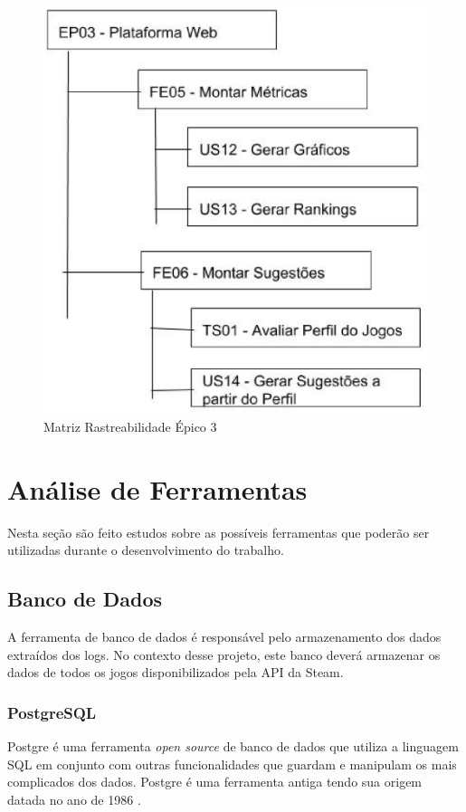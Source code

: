 \begin{figure}
\centering
\includegraphics[scale=0.35]{figuras/EP03.eps}
\caption{Matriz Rastreabilidade Épico 3}
\label{image:ep03}
\end{figure}
\section{Análise de Ferramentas}
Nesta seção são feito estudos sobre as possíveis ferramentas que poderão ser utilizadas durante o desenvolvimento do trabalho.
\subsection{Banco de Dados}
A ferramenta de banco de dados é responsável pelo armazenamento dos dados extraídos dos logs. No contexto desse projeto, este banco deverá armazenar os dados de todos os jogos disponibilizados pela API da Steam.
\subsubsection*{PostgreSQL}
Postgre é uma ferramenta \textit{open source} de banco de dados que utiliza a linguagem SQL em conjunto com outras funcionalidades que guardam e manipulam os mais complicados dos dados. Postgre é uma ferramenta antiga tendo sua origem datada no ano de 1986 \cite{postgresql}.


